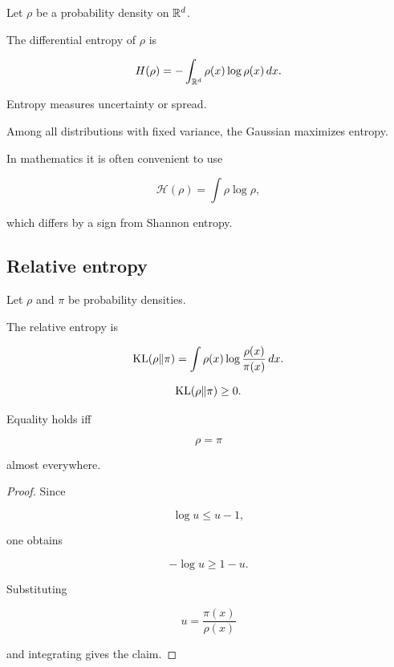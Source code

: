 Let $\rho$ be a probability density on $\mathbb{R}^d$.

\begin{definition}
The differential entropy of $\rho$ is

\[
H(\rho)
=
-
\int_{\mathbb{R}^d}
\rho(x)\log\rho(x)\,dx.
\]

Entropy measures uncertainty or spread.
\end{definition}

\begin{example}
Among all distributions with fixed variance,
the Gaussian maximizes entropy.
\end{example}

\begin{remark}
In mathematics it is often convenient to use

\[
\mathcal H(\rho)
=
\int \rho\log\rho,
\]

which differs by a sign from Shannon entropy.
\end{remark}

\subsection{Relative entropy}

\begin{definition}

Let $\rho$ and $\pi$ be probability densities.

The relative entropy is

\[
\mathrm{KL}(\rho\|\pi)
=
\int
\rho(x)
\log
\frac{\rho(x)}{\pi(x)}
\,dx.
\]

\end{definition}

\begin{theorem}

\[
\mathrm{KL}(\rho\|\pi)\ge0.
\]

Equality holds iff

\[
\rho=\pi
\]

almost everywhere.

\end{theorem}

\begin{proof}

Since

\[
\log u \le u-1,
\]

one obtains

\[
-\log u \ge 1-u.
\]

Substituting

\[
u=\frac{\pi(x)}{\rho(x)}
\]

and integrating gives the claim.

\end{proof}


